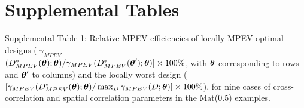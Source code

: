 \documentclass[12pt]{article}
\def\btheta{\mbox{\boldmath$\theta$}}
\begin{document}
\section{Supplemental Tables}
\vspace{5mm}
\renewcommand{\baselinestretch}{1.0}
\noindent
Supplemental Table 1:  Relative MPEV-efficiencies of locally MPEV-optimal designs ($[\gamma_{MPEV}$\\$(D^{*}_{MPEV}(\btheta);\btheta)/\gamma_{MPEV}(D^{*}_{MPEV}(\btheta^{\prime});\btheta)]\times 100\%$, with $\btheta$ corresponding to rows and $\btheta^{\prime}$ to columns) and the locally worst design ($[\gamma_{MPEV}(D^{*}_{MPEV}(\btheta);\btheta)/\max_{D}\gamma_{MPEV}(D;\btheta)]\times 100\%$), for nine cases of cross-correlation and spatial correlation parameters in the Mat(0.5) examples.
\end{document}
